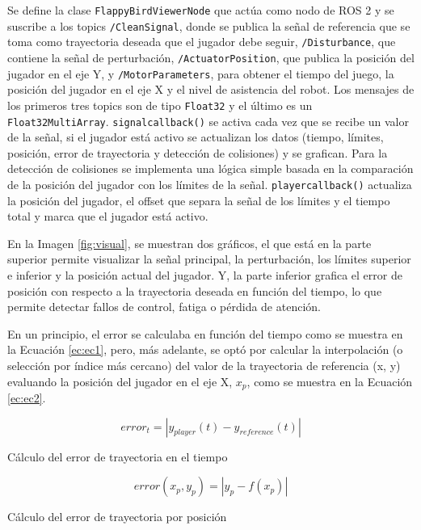 Se define la clase \verb|FlappyBirdViewerNode| que actúa como nodo de ROS 2 y se suscribe a los topics \verb|/CleanSignal|, donde se publica la señal de referencia que se toma como trayectoria deseada que el jugador debe seguir, \verb|/Disturbance|, que contiene la señal de perturbación, \verb|/ActuatorPosition|, que publica la posición del jugador en el eje Y, y \verb|/MotorParameters|, para obtener el tiempo del juego, la posición del jugador en el eje X y el nivel de asistencia del robot.
Los mensajes de los primeros tres topics son de tipo \verb|Float32| y el último es un \verb|Float32MultiArray|.
\verb|signalcallback()| se activa cada vez que se recibe un valor de la señal, si el jugador está activo se actualizan los datos (tiempo, límites, posición, error de trayectoria y detección de colisiones) y se grafican.
Para la detección de colisiones se implementa una lógica simple basada en la comparación de la posición del jugador con los límites de la señal.
\verb|playercallback()| actualiza la posición del jugador, el offset que separa la señal de los límites y el tiempo total y marca que el jugador está activo.

En la Imagen \ref{fig:visual}, se muestran dos gráficos, el que está en la parte superior permite visualizar la señal principal, la perturbación, los límites superior e inferior y la posición actual del jugador.
Y, la parte inferior grafica el error de posición con respecto a la trayectoria deseada en función del tiempo, lo que permite detectar fallos de control, fatiga o pérdida de atención.

En un principio, el error se calculaba en función del tiempo como se muestra en la Ecuación \ref{ec:ec1}, pero, más adelante, se optó por calcular la interpolación (o selección por índice más cercano) del valor de la trayectoria de referencia (x, y) evaluando la posición del jugador en el eje X, $x_p$, como se muestra en la Ecuación \ref{ec:ec2}.

\begin{myequation}[h]
\begin{equation}
error_t = | y_{player}(t) - y_{reference}(t) |
\nonumber
\label{ec:ec1}
\end{equation}
\caption[Cálculo del error de trayectoria en el tiempo]{Cálculo del error de trayectoria en el tiempo}

\begin{equation}
error(x_p, y_p) = | y_p - f(x_p) |
\nonumber
\label{ec:ec2}
\end{equation}
\caption[Cálculo del error de trayectoria por posición]{Cálculo del error de trayectoria por posición}
\end{myequation}

